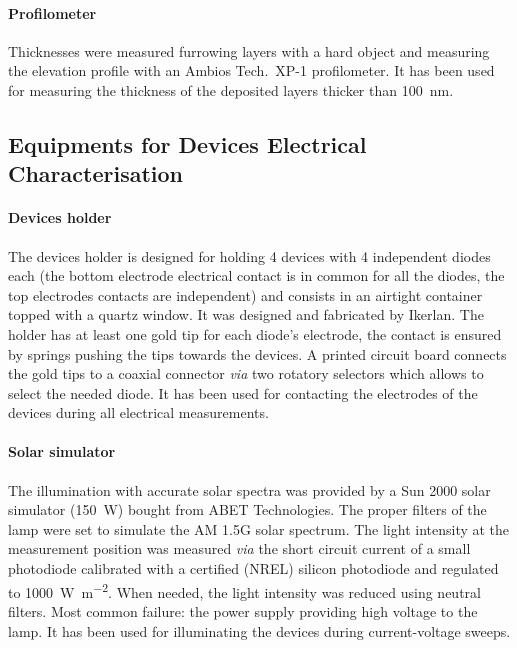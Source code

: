 		\paragraph{Profilometer}
		Thicknesses were measured furrowing layers with a hard object and measuring the elevation profile with an Ambios Tech.\ XP-1 profilometer.
		It has been used for measuring the thickness of the deposited layers thicker than \SI{100}{\nm}.

	\subsection{Equipments for Devices Electrical Characterisation}

		\paragraph{Devices holder}
		The devices holder is designed for holding 4 devices with 4 independent diodes each (the bottom electrode electrical contact is in common for all the diodes, the top electrodes contacts are independent) and consists in an airtight container topped with a quartz window.
		It was designed and fabricated by Ikerlan.
		The holder has at least one gold tip for each diode's electrode, the contact is ensured by springs pushing the tips towards the devices.
		A printed circuit board connects the gold tips to a coaxial connector \textsl{via} two rotatory selectors which allows to select the needed diode.
		It has been used for contacting the electrodes of the devices during all electrical measurements.

		\paragraph{Solar simulator}\label{solarsimulator}
		The illumination with accurate solar spectra was provided by a Sun 2000 solar simulator (\SI{150}{\W}) bought from ABET Technologies.
		The proper filters of the lamp were set to simulate the AM 1.5G solar spectrum.
		The light intensity at the measurement position was measured \textsl{via} the short circuit current of a small photodiode calibrated with a certified (NREL) silicon photodiode and regulated to \SI{1000}{\W\per\m\squared}.
		When needed, the light intensity was reduced using neutral filters.
		Most common failure: the power supply providing high voltage to the lamp.
		It has been used for illuminating the devices during current-voltage sweeps.

